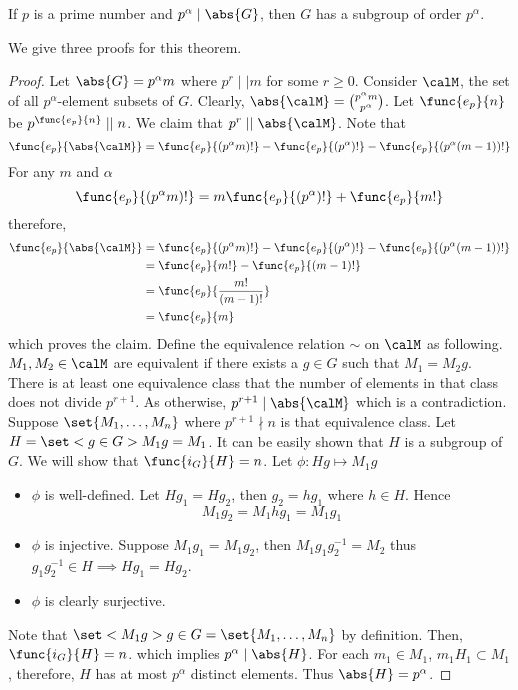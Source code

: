 \begin{theorem}[Sylow]
    If \(p\) is a prime number and \(p^{\alpha} \mid \abs{G}\), then \(G\) has a subgroup of order \(p^{\alpha}\).
\end{theorem}
We give three proofs for this theorem.
\begin{proof}
    Let \(\abs{G} = p^{\alpha}m\) where \(p^r \mid\mid m\) for some \(r \geq 0\). Consider \(\calM\), the set of all \(p^{\alpha}\)-element subsets of \(G\). Clearly, \(\abs{\calM} = \binom{p^{\alpha} m}{p^{\alpha}}\). Let \(\func{e_p}{n}\) be \(p^{\func{e_p}{n}} \mid\mid n\).
     We claim that \(p^r \mid \mid \abs{\calM}\). Note that 
    \begin{equation*}
        \func{e_p}{\abs{\calM}} =  \func{e_p}{(p^{\alpha}m)!} -  \func{e_p}{(p^{\alpha})!} -  \func{e_p}{(p^{\alpha}(m - 1))!}
    \end{equation*}
    For any \(m\) and \(\alpha\)
    \begin{equation*}
        \func{e_p}{(p^{\alpha}m)!} = m \func{e_p}{(p^{\alpha})!} + \func{e_p}{m!}
    \end{equation*}
    therefore,
    \begin{align*}
        \func{e_p}{\abs{\calM}} &=  \func{e_p}{(p^{\alpha}m)!} -  \func{e_p}{(p^{\alpha})!} -  \func{e_p}{(p^{\alpha}(m - 1))!}\\
        &= \func{e_p}{m!} - \func{e_p}{(m-1)!} \\
        &= \func{e_p}{\dfrac{m!}{(m-1)!}} \\
        &= \func{e_p}{m}
    \end{align*}
    which proves the claim. Define the equivalence relation \(\sim\) on \(\calM\) as following. \(M_1, M_2 \in \calM\) are equivalent if there exists a \(g \in G\) such that  \(M_1 = M_2 g\). There is at least one equivalence class that the number of elements in that class does not divide \(p^{r+1}\). As otherwise, \(p^{r+1}\mid \abs{\calM}\) which is a contradiction. Suppose \(\set{M_1, \dots, M_n}\) where \(p^{r+1} \nmid n\) is that equivalence class. Let \(H = \set<g \in G>{M_1 g = M_1}\). It can be easily shown that \(H\) is a subgroup of \(G\). We will show that \(\func{i_G}{H} = n\). Let \(\phi: Hg \mapsto M_1 g\)
    \begin{itemize}
        \item \(\phi\) is well-defined. Let \(Hg_1 = Hg_2\), then \(g_2 = hg_1\) where \(h \in H\). Hence 
        \begin{equation*}
            M_1 g_2 = M_1 hg_1 = M_1 g_1
        \end{equation*}
        \item \(\phi\) is injective. Suppose \(M_1 g_1 = M_1 g_2\), then \(M_1 g_1g^{-1}_2 = M_2\) thus \(g_1g_2^{-1} \in H \implies H g_1 = H g_2\).
        \item \(\phi\) is clearly surjective. 
    \end{itemize}
    Note that \(\set<M_1g>{g \in G} = \set{M_1, \dots, M_n}\) by definition. Then, \(\func{i_G}{H} = n\). which implies \(p^{\alpha} \mid \abs{H}\). For each \(m_1 \in M_1\), \(m_1 H_1 \subset M_1\), therefore, \(H\) has at most \(p^{\alpha}\) distinct elements. Thus \(\abs{H} = p^{\alpha}\).
\end{proof}

